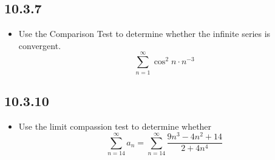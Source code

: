 \begin{itemize}
    \subsection{10.3.7}
    \begin{itemize}
      \item Use the Comparison Test to determine whether the infinite series is
        convergent.
        \[%
        \sum_{n=1}^{\infty} \cos ^2 n \cdot n^{-3}
        \]%
    \end{itemize}

    \subsection{10.3.10}
    \begin{itemize}
      \item Use the limit compassion test to determine whether
        \[%
          \sum_{n=14}^{\infty} a_n = \sum_{n=14}^{\infty} \frac{9n^3 - 4n^2 + 14}{2+4n^4}
        \]%
    \end{itemize}
\end{itemize}
